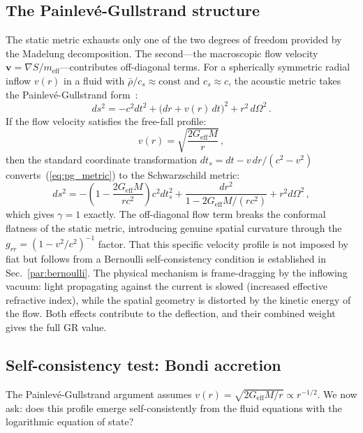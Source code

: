 \documentclass[12pt, a4paper]{article}
\begin{document}
\subsection{The Painlev\'{e}-Gullstrand structure}
The static metric exhausts only one of the two degrees of freedom provided by the Madelung decomposition. The second---the macroscopic flow velocity $\mathbf{v} = \nabla S/m_{\mathrm{eff}}$---contributes off-diagonal terms. For a spherically symmetric radial inflow $v(r)$ in a fluid with $\bar{\rho}/c_s \approx \text{const}$ and $c_s \approx c$, the acoustic metric takes the Painlev\'{e}-Gullstrand form~\cite{unruh_1981,visser_1998,volovik_2003}:
\begin{equation}
    ds^2 = -c^2 dt^2 + \big(dr + v(r)\,dt\big)^2 + r^2\,d\Omega^2\,.
\label{eq:pg_metric}
\end{equation}
If the flow velocity satisfies the free-fall profile:
\begin{equation}
    v(r) = \sqrt{\frac{2G_{\mathrm{eff}}M}{r}}\,,
\label{eq:pg_velocity}
\end{equation}
then the standard coordinate transformation $dt_s = dt - v\,dr/(c^2 - v^2)$ converts~(\ref{eq:pg_metric}) to the Schwarzschild metric:
\begin{equation}
    ds^2 = -\!\left(1 - \frac{2G_{\mathrm{eff}}M}{rc^2}\right)c^2 dt_s^2 + \frac{dr^2}{1 - 2G_{\mathrm{eff}}M/(rc^2)} + r^2 d\Omega^2\,,
\end{equation}
which gives $\gamma = 1$ exactly. The off-diagonal flow term breaks the conformal flatness of the static metric, introducing genuine spatial curvature through the $g_{rr} = (1 - v^2/c^2)^{-1}$ factor. That this specific velocity profile is not imposed by fiat but follows from a Bernoulli self-consistency condition is established in Sec.~\ref{par:bernoulli}.
The physical mechanism is frame-dragging by the inflowing vacuum: light propagating against the current is slowed (increased effective refractive index), while the spatial geometry is distorted by the kinetic energy of the flow. Both effects contribute to the deflection, and their combined weight gives the full GR value.

\subsection{Self-consistency test: Bondi accretion}

The Painlev\'{e}-Gullstrand argument assumes $v(r) = \sqrt{2G_{\mathrm{eff}}M/r} \propto r^{-1/2}$. We now ask: does this profile emerge self-consistently from the fluid equations with the logarithmic equation of state?
\end{document}
